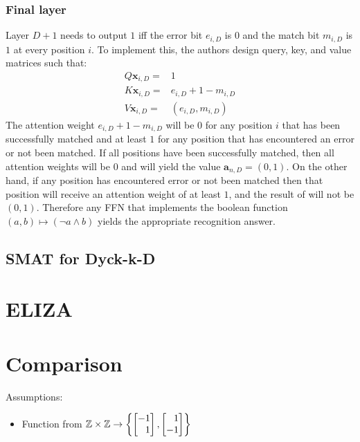 \subsubsection{Final layer}
Layer $D + 1$ needs to output $1$ iff the error bit $e_{i,D}$ is $0$ and the match bit $m_{i,D}$ is $1$ at every position $i$. To implement this, the authors design query, key, and value matrices such that:\begin{align*}
    Q\mathbf{x}_{i,D} = & 1 \\
    K\mathbf{x}_{i,D} = & e_{i,D}+1-m_{i,D}\\
    V\mathbf{x}_{i,D} = & (e_{i,D},m_{i,D})
\end{align*}
The attention weight $e_{i,D}+1-m_{i,D}$ will be $0$ for any position $i$ that has been successfully matched and at least $1$ for any position that has encountered an error or not been matched. If all positions have been successfully matched, then all attention weights will be $0$ and \UHAT{} will yield the value $\mathbf{a}_{n,D}=(0,1)$. On the other hand, if any position has encountered error or not been matched then that position will receive an attention weight of at least $1$, and the result of \UHAT{} will not be $(0,1)$. Therefore any FFN that implements the boolean function $(a,b) \mapsto (\neg a \land b)$ yields the appropriate recognition answer.

\subsection{SMAT for Dyck-k-D}



\section{ELIZA}


\section{Comparison}
\label{sec:assembly_comparison}


Assumptions:
\begin{itemize}
    \item Function from $\Z\times\Z\to \left\{\begin{bmatrix}
            -1\\\phantom- 1
        \end{bmatrix}, \begin{bmatrix}
            \phantom- 1\\-1
        \end{bmatrix}\right\}$
\end{itemize}

